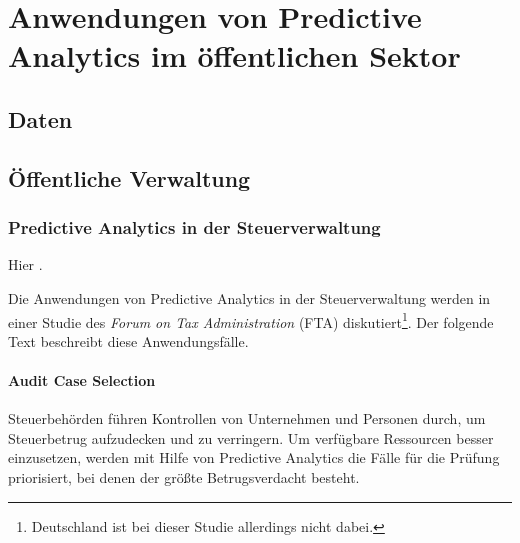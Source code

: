 \chapter{Anwendungen von Predictive Analytics im öffentlichen Sektor}


\section{Daten}


\section{Öffentliche Verwaltung}



\subsection{Predictive Analytics in der Steuerverwaltung}

Hier \cite{OECD}.


Die Anwendungen von Predictive Analytics in der Steuerverwaltung werden in einer
Studie des \emph{Forum on Tax Administration} (FTA) diskutiert\footnote{
Deutschland ist bei dieser Studie allerdings nicht dabei.
}. Der folgende Text beschreibt diese Anwendungsfälle.

\subsubsection{Audit Case Selection}

Steuerbehörden führen Kontrollen von Unternehmen und Personen durch, um Steuerbetrug
aufzudecken und zu verringern. Um verfügbare Ressourcen besser einzusetzen, werden mit Hilfe
von Predictive Analytics die Fälle für die Prüfung priorisiert, bei denen der größte Betrugsverdacht
besteht.

